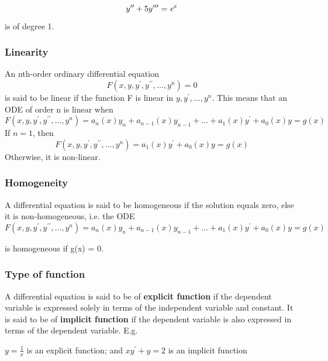 \documentclass[12pt]{article}
\begin{document}
	\begin{equation}
	y^{\prime\prime} + 5y^{\prime\prime\prime} = \textit e^x  
	\end{equation}
	is of degree 1.
	
	\subsubsection*{Linearity} 
	An nth-order ordinary differential equation 
	\begin{equation}
	F(x,y,y^\prime,y^{\prime\prime},\dots,y^n ) = 0
	\end{equation} is said to be linear if the function F is linear in $y, y^\prime, ... , y^n$. This means that an ODE of order n is linear when
	 \begin{equation}
	F(x,y,y^\prime,y^{\prime\prime},\dots,y^n ) = a_n(x)y_n + a_{n-1}(x)y_{n-1} + \dots + a_1(x)y^\prime + a_0(x)y = g(x)  
	 \end{equation}
	If $n = 1$, then
		\begin{equation}
		F(x,y,y^\prime,y^{\prime\prime},\dots,y^n ) = a_1(x)y^\prime + a_0(x)y = g(x)
		\end{equation} Otherwise, it is non-linear.
	
	\subsubsection*{Homogeneity}
	 A differential equation is said to be homogeneous if the solution equals zero, else it is non-homogeneous, i.e. the ODE \medskip
	 \begin{equation}
	 F(x,y,y^\prime,y^{\prime\prime},\dots,y^n ) = a_n(x)y_n + a_{n-1}(x)y_{n-1} + \dots + a_1(x)y^\prime + a_0(x)y = g(x) 
	 \end{equation}
	 
	 is homogeneous if g(x) = 0.
	
\subsubsection{Type of function}
	 A differential equation is said to be of \textbf{explicit function} if the dependent variable is expressed solely in terms of the independent variable and constant. It is said to be of \textbf{implicit function} if the dependent variable is also expressed in terms of the dependent variable. E.g.
	 
		$y = \frac{1}{x}$  is an explicit function; and
		$xy^\prime + y = 2$  is an implicit function
	
\end{document}
